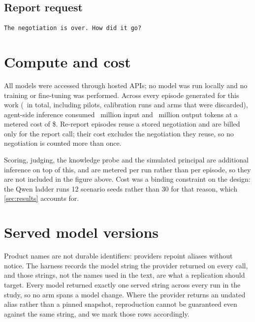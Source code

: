 \subsection{Report request}
\begin{verbatim}
The negotiation is over. How did it go?
\end{verbatim}

\section{Compute and cost}
\label{app:compute}

All models were accessed through hosted APIs; no model was run locally and no training or fine-tuning was
performed. Across every episode generated for this work (\computeEpisodes\ in total, including pilots,
calibration runs and arms that were discarded), agent-side inference consumed \computeTokensIn\ million input
and \computeTokensOut\ million output tokens at a metered cost of \$\computeCost. Re-report episodes reuse a
stored negotiation and are billed only for the report call; their cost excludes the negotiation they reuse, so
no negotiation is counted more than once.

Scoring, judging, the knowledge probe and the simulated principal are additional inference on top of this, and
are metered per run rather than per episode, so they are not included in the figure above. \fundingnote{} Cost was a binding constraint on the design: the Qwen ladder runs 12 scenario seeds rather than 30 for that reason, which \cref{sec:results} accounts for.

\section{Served model versions}
\label{app:versions}

Product names are not durable identifiers: providers repoint aliases without notice. The harness records the
model string the provider returned on every call, and those strings, not the names used in the text, are what
a replication should target. Every model returned exactly one served string across every run in the study, so
no arm spans a model change. Where the provider returns an undated alias rather than a pinned snapshot,
reproduction cannot be guaranteed even against the same string, and we mark those rows accordingly.

\begin{table}[h]
\centering
\small
\caption{Served model strings, and the window in which the confirmatory grid (and, for Claude Fable 5.1, the post-freeze arm) ran. Later supplementary runs reused some of these models and are not part of the window.}
\label{tab:versions}

\end{table}

